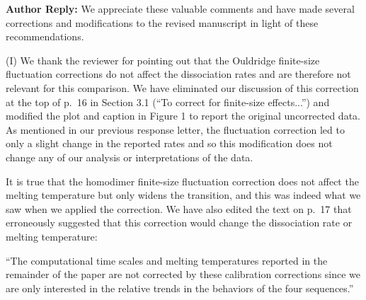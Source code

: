 \documentclass[11pt,a4paper]{letter} %
\newcommand*{\roodr}[1]{{\color{red}{#1}}}
\begin{document}

\textbf{Author Reply:} We appreciate these valuable comments and have made several corrections and modifications to the revised manuscript in light of these recommendations.

(I) We thank the reviewer for pointing out that the Ouldridge finite-size fluctuation corrections do not affect the dissociation rates and are therefore not relevant for this comparison. We have eliminated our discussion of this correction at the top of p.~16 in Section 3.1 (``To correct for finite-size effects...'') and modified the plot and caption in Figure 1 to report the original uncorrected data. As mentioned in our previous response letter, the fluctuation correction led to only a slight change in the reported rates and so this modification does not change any of our analysis or interpretations of the data.

It is true that the homodimer finite-size fluctuation correction does not affect the melting temperature but only widens the transition, and this was indeed what we saw when we applied the correction. We have also edited the text on p.~17 that erroneously suggested that this correction would change the dissociation rate or melting temperature:

``The computational time scales and melting temperatures reported in the remainder of the paper are not corrected by these calibration corrections \roodr{\st{or finite-size fluctuations}} since we are only interested in the relative trends in the behaviors of the four sequences.''
\end{document}
